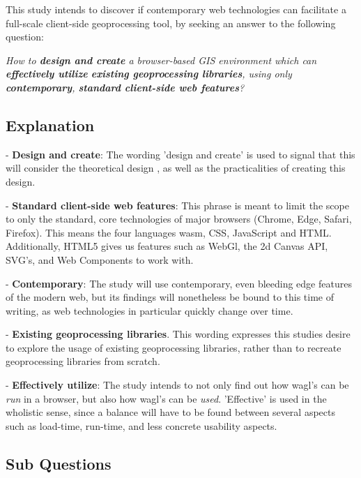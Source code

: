 
This study intends to discover if contemporary web technologies can facilitate a full-scale client-side geoprocessing tool, by seeking an answer to the following question: 

\textit{How to \textbf{design and create} a browser-based GIS environment which can \textbf{effectively utilize} \textbf{existing geoprocessing libraries}, using only \textbf{contemporary}, \textbf{standard client-side web features}?}

\subsection*{Explanation}


- \textbf{Design and create}: The wording 'design and create' is used to signal that this will consider the theoretical design , as well as the practicalities of creating this design. 

- \textbf{Standard client-side web features}: This phrase is meant to limit the scope to only the standard, core technologies of major browsers (Chrome, Edge, Safari, Firefox). This means the four languages \ac{wasm}, CSS, JavaScript and HTML. Additionally, HTML5 gives us features such as WebGl, the 2d Canvas API, SVG's, and Web Components to work with.

- \textbf{Contemporary}: The study will use contemporary, even bleeding edge features of the modern web, but its findings will nonetheless be bound to this time of writing, as web technologies in particular quickly change over time. 

- \textbf{Existing geoprocessing libraries}. This wording expresses this studies desire to explore the usage of existing geoprocessing libraries, rather than to recreate geoprocessing libraries from scratch.

- \textbf{Effectively utilize}: The study intends to not only find out how wagl's can be \textit{run} in a browser, but also how wagl's can be \textit{used}. 'Effective' is used in the wholistic sense, since a balance will have to be found between several aspects such as load-time, run-time, and less concrete usability aspects. 


\subsection*{Sub Questions}

